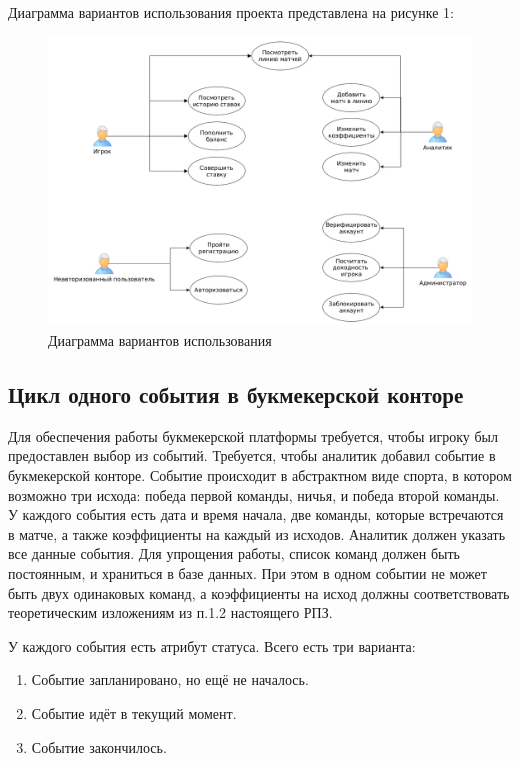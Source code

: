 Диаграмма вариантов использования проекта представлена на рисунке 1:

\FloatBarrier
\begin{figure}[hp]	
	\begin{center}
		\includegraphics[width=\linewidth]{inc/useCase.png}
	\end{center}
	\captionsetup{justification=centering, labelsep=defffis}
	\caption{Диаграмма вариантов использования}
	\label{fig::UseCase}
\end{figure}
\FloatBarrier

\newpage

\subsection{Цикл одного события в букмекерской конторе}
Для обеспечения работы букмекерской платформы требуется, чтобы игроку был предоставлен выбор из событий.
Требуется, чтобы аналитик добавил событие в букмекерской конторе. 
Событие происходит в абстрактном виде спорта, в котором возможно три исхода: победа первой команды, ничья, и победа второй команды. 
У каждого события есть дата и время начала, две команды, которые встречаются в матче, а также коэффициенты на каждый из исходов.
Аналитик должен указать все данные события. 
Для упрощения работы, список команд должен быть постоянным, и храниться в базе данных. 
При этом в одном событии не может быть двух одинаковых команд, а коэффициенты на исход должны соответствовать теоретическим изложениям из п.1.2 настоящего РПЗ.

У каждого события есть атрибут статуса. Всего есть три варианта:
\begin{enumerate}
	\item Событие запланировано, но ещё не началось.
	\item Событие идёт в текущий момент.
	\item Событие закончилось.
\end{enumerate} 

